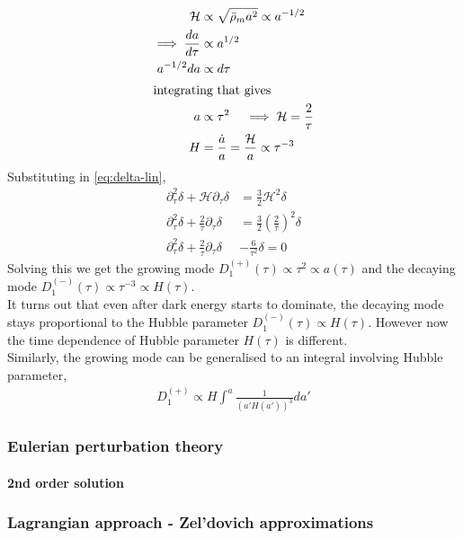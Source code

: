 \documentclass[12pt,twocolumn]{article}
\begin{document}
\begin{align}
\mathcal{H} &\propto \sqrt{\bar{\rho}_{m} a^2} \propto a^{-1/2}\\
\implies \frac{da}{d\tau} &\propto a^{1/2}\\
a^{-1/2} da &\propto d \tau\\
\intertext{integrating that gives }
a &\propto \tau^2 \quad \implies \mathcal{H} = \frac{2}{\tau}\\
H &= \frac{\dot{a}}{a} = \frac{\mathcal{H}}{a} \propto \tau^{-3}
\end{align}
Substituting in \eqref{eq:delta-lin},
\begin{align}
\partial_{\tau}^2 \delta + \mathcal{H} \partial_{\tau} \delta &= \frac{3}{2} \mathcal{H}^2 \delta\\
\partial_{\tau}^2 \delta + \frac{2}{\tau} \partial_{\tau} \delta &= \frac{3}{2} \left( \frac{2}{\tau} \right) ^2 \delta\\
\partial_{\tau}^2 \delta + \frac{2}{\tau} \partial_{\tau} \delta &- \frac{6}{\tau^2} \delta = 0
\end{align}
Solving this we get the growing mode $D_1^{(+)}(\tau) \propto \tau^2 \propto a(\tau)$ and the decaying mode $D_1^{(-)}(\tau) \propto \tau^{-3} \propto  H(\tau)$.\\
It turns out that even after dark energy starts to dominate, the decaying mode stays proportional to the Hubble parameter $D_1^{(-)}(\tau) \propto H(\tau)$. However now the time dependence of Hubble parameter $H(\tau)$ is different.  \\
Similarly, the growing mode can be generalised to an integral involving Hubble parameter,
\begin{align}
D_1^{(+)} \propto H \int^{a} \frac{1}{(a'H(a'))^3} da'
\end{align}


\subsubsection{Eulerian perturbation theory}

\paragraph{2nd order solution}


\subsubsection{Lagrangian approach - Zel'dovich approximations}
\end{document}

